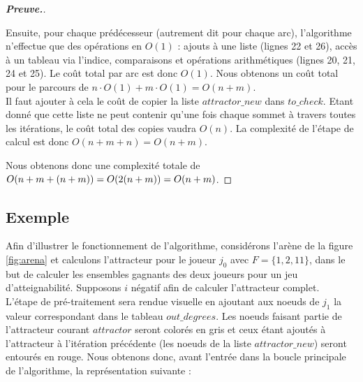 \documentclass[12pt,a4paper,oneside,titlepage]{report}
\newenvironment{demonstration}{\begin{proof}[\textnormal{\textbf{Preuve.}}]}{\end{proof}}
\begin{document}
\begin{demonstration}
\begin{itemize}
Ensuite, pour chaque prédécesseur (autrement dit pour chaque arc), l'algorithme n'effectue que des opérations en $O(1)$ : ajouts à une liste (lignes 22 et 26), accès à un tableau via l'indice, comparaisons et opérations arithmétiques (lignes 20, 21, 24 et 25). Le coût total par arc est donc $O(1)$. Nous obtenons un coût total pour le parcours de $n\cdot O(1)+m\cdot O(1) = O(n+m)$.\\
Il faut ajouter à cela le coût de copier la liste $attractor\_new$ dans $to\_check$. Etant donné que cette liste ne peut contenir qu'une fois chaque sommet à travers toutes les itérations, le coût total des copies vaudra $O(n)$. La complexité de l'étape de calcul est donc $O(n+m+n)=O(n+m)$.
\end{itemize}
Nous obtenons donc une complexité totale de $O(n+m+(n+m)) = O(2(n+m))\\
= O(n+m)$.
\end{demonstration}
\newpage
\subsection{Exemple}
Afin d'illustrer le fonctionnement de l'algorithme, considérons l'arène de la figure \ref{fig:arena} et calculons l'attracteur pour le joueur $j_0$ avec  $F=\{1,2,11\}$, dans le but de calculer les ensembles gagnants des deux joueurs pour un jeu d'atteignabilité. Supposons $i$ négatif afin de calculer l'attracteur complet.\\
L'étape de pré-traitement sera rendue visuelle en ajoutant aux noeuds de $j_1$ la valeur correspondant dans le tableau $out\_degrees$. Les noeuds faisant partie de l'attracteur courant $attractor$ seront colorés en gris et ceux étant ajoutés à l'attracteur à l'itération précédente (les noeuds de la liste $attractor\_new$) seront entourés en rouge.
Nous obtenons donc, avant l'entrée dans la boucle principale de l'algorithme, la représentation suivante :\\
\end{document}
